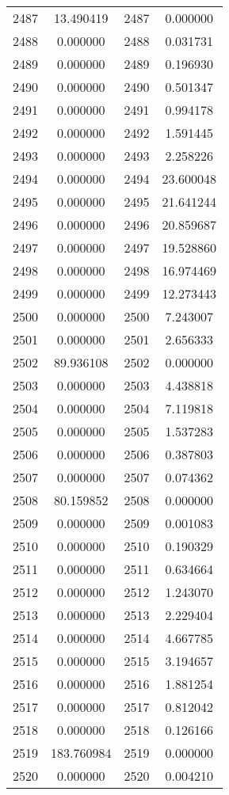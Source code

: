 \documentclass[12pt]{article}
\begin{document}
\begin{longtable}{@{}cccc@{}}
2487 & 13.490419 & 2487 & 0.000000 \\
2488 & 0.000000 & 2488 & 0.031731 \\
2489 & 0.000000 & 2489 & 0.196930 \\
2490 & 0.000000 & 2490 & 0.501347 \\
2491 & 0.000000 & 2491 & 0.994178 \\
2492 & 0.000000 & 2492 & 1.591445 \\
2493 & 0.000000 & 2493 & 2.258226 \\
2494 & 0.000000 & 2494 & 23.600048 \\
2495 & 0.000000 & 2495 & 21.641244 \\
2496 & 0.000000 & 2496 & 20.859687 \\
2497 & 0.000000 & 2497 & 19.528860 \\
2498 & 0.000000 & 2498 & 16.974469 \\
2499 & 0.000000 & 2499 & 12.273443 \\
2500 & 0.000000 & 2500 & 7.243007 \\
2501 & 0.000000 & 2501 & 2.656333 \\
2502 & 89.936108 & 2502 & 0.000000 \\
2503 & 0.000000 & 2503 & 4.438818 \\
2504 & 0.000000 & 2504 & 7.119818 \\
2505 & 0.000000 & 2505 & 1.537283 \\
2506 & 0.000000 & 2506 & 0.387803 \\
2507 & 0.000000 & 2507 & 0.074362 \\
2508 & 80.159852 & 2508 & 0.000000 \\
2509 & 0.000000 & 2509 & 0.001083 \\
2510 & 0.000000 & 2510 & 0.190329 \\
2511 & 0.000000 & 2511 & 0.634664 \\
2512 & 0.000000 & 2512 & 1.243070 \\
2513 & 0.000000 & 2513 & 2.229404 \\
2514 & 0.000000 & 2514 & 4.667785 \\
2515 & 0.000000 & 2515 & 3.194657 \\
2516 & 0.000000 & 2516 & 1.881254 \\
2517 & 0.000000 & 2517 & 0.812042 \\
2518 & 0.000000 & 2518 & 0.126166 \\
2519 & 183.760984 & 2519 & 0.000000 \\
2520 & 0.000000 & 2520 & 0.004210 \\

\end{longtable}
\end{document}
